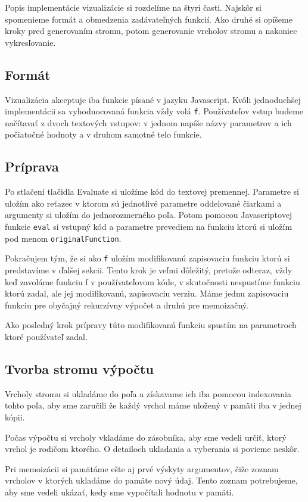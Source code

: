 Popis implementácie vizualizácie si rozdelíme na štyri časti. Najskôr si spomenieme
formát a obmedzenia zadávateľných funkcií. Ako druhé si opíšeme kroky
pred generovaním stromu, potom generovanie vrcholov stromu a nakoniec vykresľovanie.

\subsection{Formát}
Vizualizácia akceptuje iba funkcie písané v jazyku Javascript. Kvôli jednoduchšej implementácii
sa vyhodnocovaná funkcia vždy volá \lstinline[language=Javascript]{f}. Používateľov
vstup budeme načítavať z dvoch textových vstupov: v jednom napíše názvy parametrov
a ich počiatočné hodnoty a v druhom samotné telo funkcie.
\subsection{Príprava}
Po stlačení tlačidla Evaluate si uložíme kód do textovej premennej. Parametre si uložím
ako reťazec v ktorom sú jednotlivé parametre oddelované čiarkami a argumenty si
uložím do jednorozmerného poľa. Potom pomocou Javascriptovej funkcie \lstinline[language=Javascript]{eval}
si vstupný kód a parametre prevediem na funkciu ktorú si uložím pod menom \lstinline[language=Javascript]{originalFunction}.

Pokračujem tým, že si ako \lstinline[language=Javascript]{f} uložím modifikovanú zapisovaciu funkciu
ktorú si predstavíme v ďalšej sekcii. Tento krok je veľmi dôležitý, pretože odteraz, vždy keď zavoláme funkciu
f v používateľovom kóde, v skutočnosti nespustíme funkciu ktorú zadal, ale jej modifikovanú,
zapisovaciu verziu. Máme jednu zapisovaciu funkciu pre obyčajný rekurzívny výpočet
a druhú pre memoizačný.

Ako posledný krok prípravy túto modifikovanú funkciu spustím
na parametroch ktoré používateľ zadal.

\subsection{Tvorba stromu výpočtu}
Vrcholy stromu si ukladáme do poľa a získavame ich iba pomocou indexovania tohto
poľa, aby sme zaručili že každý vrchol máme uložený v pamäti iba v jednej kópii.

Počas výpočtu si vrcholy vkladáme do zásobníka, aby sme vedeli určiť, ktorý vrchol
je rodičom ktorého. O detailoch ukladania a vyberania si povieme neskôr.

Pri memoizácii si pamätáme ešte aj prvé výskyty argumentov, čiže zoznam vrcholov
v ktorých ukladáme do pamäte nový údaj. Tento zoznam potrebujeme, aby sme vedeli
ukázať, kedy sme vypočítali hodnotu v pamäti.

